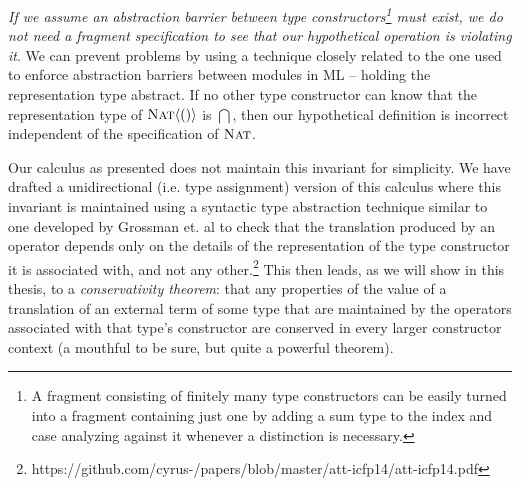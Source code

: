 
\emph{If we assume an abstraction barrier between type constructors\footnote{A fragment consisting of finitely many type constructors can be easily turned into a fragment containing just one by adding a sum type to the index and case analyzing against it whenever a distinction is necessary.} must exist, we do not need a fragment specification to see that our hypothetical operation is violating it}. We can prevent problems by using a technique closely related to the one used to enforce abstraction barriers between modules in ML -- holding the representation type abstract. If no other type constructor can know that the representation type of $\textsc{Nat}\langle()\rangle$ is $\dint$, then our hypothetical definition is incorrect independent of the specification of $\textsc{Nat}$. 

Our calculus as presented does not maintain this invariant for simplicity. We have drafted a unidirectional (i.e. type assignment) version of this calculus where this invariant is maintained using a syntactic type abstraction technique similar to one developed by Grossman et. al \cite{journals/toplas/GrossmanMZ00} to check that the translation produced by an operator depends only on the details of the representation of the type constructor it is associated with, and not any other.\footnote{https://github.com/cyrus-/papers/blob/master/att-icfp14/att-icfp14.pdf} This then leads, as we will show in this thesis, to a \emph{conservativity theorem}: that any properties of the value of a translation of an external term of some type that are maintained by the operators associated with that type's constructor are conserved in every larger constructor context (a mouthful to be sure, but quite a powerful theorem).


